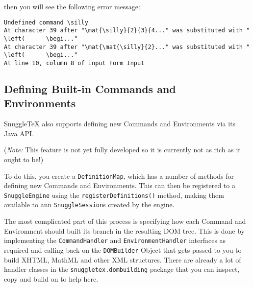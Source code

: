then you will see the following error message:

\begin{verbatim}
Undefined command \silly
At character 39 after "\mat{\silly}{2}{3}{4..." was substituted with "   \left(      \begi..."
At character 39 after "\mat{\mat{\silly}{2}..." was substituted with "   \left(      \begi..."
At line 10, column 8 of input Form Input
\end{verbatim}

\subsection*{Defining Built-in Commands and Environments}

SnuggleTeX also supports defining new Commands and Environments via its Java API.

(\emph{Note:} This feature is not yet fully developed so it is currently not as
rich as it ought to be!)

To do this, you create a \verb|DefinitionMap|, which has a number of methods for
defining new Commands and Environments. This can then be registered to a \verb|SnuggleEngine|
using the \verb|registerDefinitions()| method, making them available to ann \verb|SnuggleSession|s
created by the engine.

The most complicated part of this process is specifying how each Command and
Environment should built its branch in the resulting DOM tree. This is done
by implementing the \verb|CommandHandler| and \verb|EnvironmentHandler| interfaces
as required and calling back on the \verb|DOMBuilder| Object that gets passed
to you to build XHTML, MathML and other XML structures. There are already a lot
of handler classes in the \verb|snuggletex.dombuilding| package that you can
inspect, copy and build on to help here.
